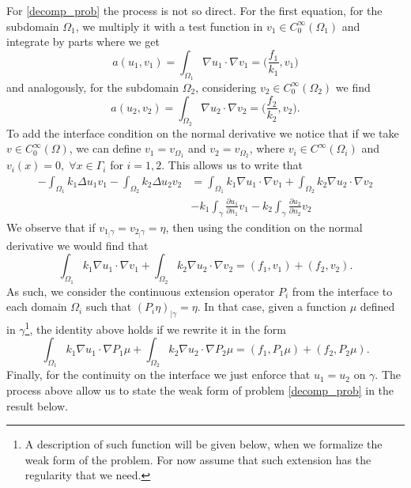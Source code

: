 For \eqref{decomp_prob} the process is not so direct. For the first equation, for the subdomain \(\Omega_1\), we multiply it with a test function in \(v_1 \in C^\infty_0(\Omega_1)\) and integrate by parts where we get 
\[
a(u_1,v_1) = \int_{\Omega_1} \nabla u_1 \cdot \nabla v_1 = \Big(\frac{f_1}{k_1}, v_1\Big)    
\]
and analogously, for the subdomain \(\Omega_2\), considering \(v_2 \in C^\infty_0(\Omega_2)\) we find
\[
a(u_2,v_2) = \int_{\Omega_2} \nabla u_2 \cdot \nabla v_2 = \Big(\frac{f_2}{k_2}, v_2\Big).        
\]
To add the interface condition on the normal derivative we notice that if we take \(v \in C^\infty_0(\Omega)\), we can define \(v_1 = v_{\Omega_1}\) and \(v_2 = v_{\Omega_2}\), where \(v_i \in C^\infty(\Omega_i)\) and \(v_i(x)=0, \; \forall x \in \Gamma_i\) for \(i=1, 2\). This allows us to write that
\begin{align*}
    -\int_{\Omega_1} k_1 \Delta u_1 v_1 -\int_{\Omega_2} k_2 \Delta u_2 v_2 &= \int_{\Omega_1} k_1\nabla u_1 \cdot \nabla v_1 + \int_{\Omega_2} k_2\nabla u_2 \cdot \nabla v_2\\
    &- k_1 \int_\gamma \frac{\partial u_1}{\partial n_1}v_1 - k_2 \int_\gamma \frac{\partial u_2}{\partial n_2}v_2
\end{align*}
We observe that if \(v_{1_|\gamma} = v_{2_|\gamma} = \eta\), then using the condition on the normal derivative we would find that 
\[
\int_{\Omega_1} k_1\nabla u_1 \cdot \nabla v_1 + \int_{\Omega_2} k_2\nabla u_2 \cdot \nabla v_2 = (f_1, v_1) + (f_2, v_2).
\]
As such, we consider the continuous extension operator \(P_i\) from the interface to each domain \(\Omega_i\) such that \((P_i \eta)_{|\gamma} = \eta\). In that case, given a function \(\mu\) defined in \(\gamma\)\footnote{A description of such function will be given below, when we formalize the weak form of the problem. For now assume that such extension has the regularity that we need.}, the identity above holds if we rewrite it in the form
\[
\int_{\Omega_1} k_1\nabla u_1 \cdot \nabla P_1 \mu + \int_{\Omega_2} k_2\nabla u_2 \cdot \nabla P_2 \mu = (f_1, P_1 \mu) + (f_2, P_2 \mu).  
\]
Finally, for the continuity on the interface we just enforce that \(u_1 = u_2\) on \(\gamma\). The process above allow us to state the weak form of problem \eqref{decomp_prob} in the result below.

